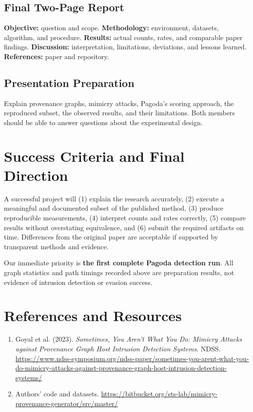 \documentclass[11pt,letterpaper]{article}
\begin{document}
\subsection{Final Two-Page Report}
\textbf{Objective:} question and scope. \textbf{Methodology:} environment, datasets, algorithm, and procedure. \textbf{Results:} actual counts, rates, and comparable paper findings. \textbf{Discussion:} interpretation, limitations, deviations, and lessons learned. \textbf{References:} paper and repository.
\subsection{Presentation Preparation}
Explain provenance graphs, mimicry attacks, Pagoda's scoring approach, the reproduced subset, the observed results, and their limitations. Both members should be able to answer questions about the experimental design.

\section{Success Criteria and Final Direction}
A successful project will (1) explain the research accurately, (2) execute a meaningful and documented subset of the published method, (3) produce reproducible measurements, (4) interpret counts and rates correctly, (5) compare results without overstating equivalence, and (6) submit the required artifacts on time. Differences from the original paper are acceptable if supported by transparent methods and evidence.

Our immediate priority is \textbf{the first complete Pagoda detection run}. All graph statistics and path timings recorded above are preparation results, not evidence of intrusion detection or evasion success.

\section*{References and Resources}
\begin{enumerate}
\item Goyal et al. (2023). \emph{Sometimes, You Aren't What You Do: Mimicry Attacks against Provenance Graph Host Intrusion Detection Systems}. NDSS. \url{https://www.ndss-symposium.org/ndss-paper/sometimes-you-arent-what-you-do-mimicry-attacks-against-provenance-graph-host-intrusion-detection-systems/}
\item Authors' code and datasets. \url{https://bitbucket.org/sts-lab/mimicry-provenance-generator/src/master/}
\end{enumerate}
\end{document}
